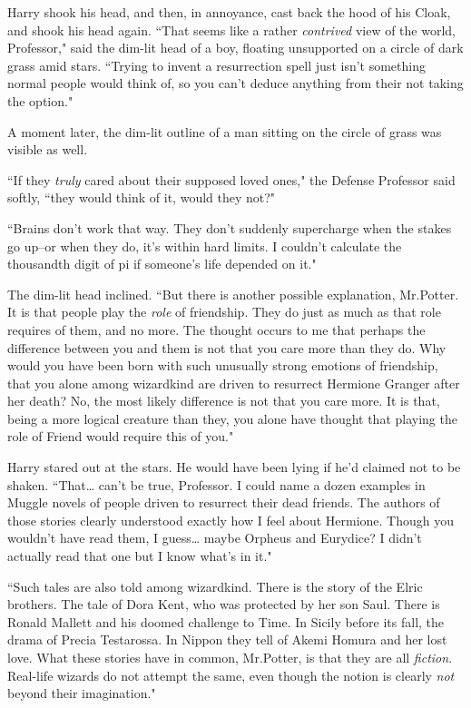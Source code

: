 Harry shook his head, and then, in annoyance, cast back the hood of his Cloak, and shook his head again. ``That seems like a rather \emph{contrived} view of the world, Professor," said the dim-lit head of a boy, floating unsupported on a circle of dark grass amid stars. ``Trying to invent a resurrection spell just isn't something normal people would think of, so you can't deduce anything from their not taking the option."

A moment later, the dim-lit outline of a man sitting on the circle of grass was visible as well.

``If they \emph{truly} cared about their supposed loved ones," the Defense Professor said softly, ``they would think of it, would they not?"

``Brains don't work that way. They don't suddenly supercharge when the stakes go up\---or when they do, it's within hard limits. I couldn't calculate the thousandth digit of pi if someone's life depended on it."

The dim-lit head inclined. ``But there is another possible explanation, Mr.\?Potter. It is that people play the \emph{role} of friendship. They do just as much as that role requires of them, and no more. The thought occurs to me that perhaps the difference between you and them is not that you care more than they do. Why would you have been born with such unusually strong emotions of friendship, that you alone among wizardkind are driven to resurrect Hermione Granger after her death? No, the most likely difference is not that you care more. It is that, being a more logical creature than they, you alone have thought that playing the role of Friend would require this of you."

Harry stared out at the stars. He would have been lying if he'd claimed not to be shaken. ``That{\ldots} can't be true, Professor. I could name a dozen examples in Muggle novels of people driven to resurrect their dead friends. The authors of those stories clearly understood exactly how I feel about Hermione. Though you wouldn't have read them, I guess{\ldots} maybe Orpheus and Eurydice? I didn't actually read that one but I know what's in it."

``Such tales are also told among wizardkind. There is the story of the Elric brothers. The tale of Dora Kent, who was protected by her son Saul. There is Ronald Mallett and his doomed challenge to Time. In Sicily before its fall, the drama of Precia Testarossa. In Nippon they tell of Akemi Homura and her lost love. What these stories have in common, Mr.\?Potter, is that they are all \emph{fiction}. Real-life wizards do not attempt the same, even though the notion is clearly \emph{not} beyond their imagination."

